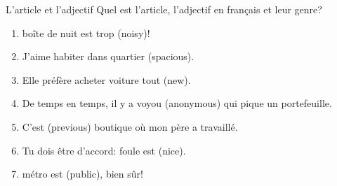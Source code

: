 \begin{frame}{L'article et l'adjectif}
  Quel est l'article, l'adjectif en français et leur genre?
  \begin{enumerate}
    \item \underline{} boîte de nuit est trop \underline{} (noisy)!
    \item J'aime habiter dans \underline{} quartier \underline{} (spacious).
    \item Elle préfère acheter \underline{} voiture tout \underline{} (new).
    \item De temps en temps, il y a \underline{} voyou \underline{} (anonymous) qui pique un portefeuille.
    \item C'est \underline{} \underline{} (previous) boutique où mon père a travaillé.
    \item Tu dois être d'accord: \underline{} foule est \underline{} (nice).
    \item \underline{} métro est \underline{} (public), bien sûr!
  \end{enumerate}
\end{frame}